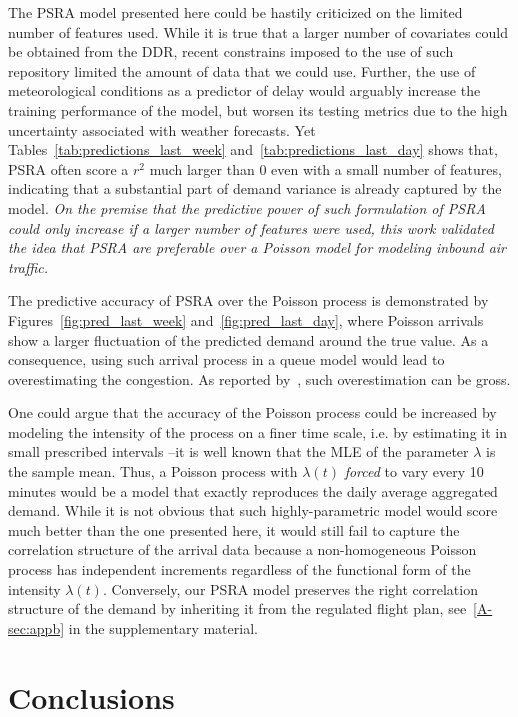 \documentclass[]{elsarticle}
\makeatletter
\newcommand*{\ie}{i.e.\@\xspace}
\makeatother
\begin{document}
  The \ac{PSRA} model presented here could be hastily criticized on the limited number of features used.
  While it is true that a larger number of covariates could be obtained from the \ac{DDR}, recent constrains imposed to the use of such repository limited the amount of data that we could use.
  Further, the use of meteorological conditions as a predictor of delay would arguably increase the training performance of the model, but worsen its testing metrics due to the high uncertainty associated with weather forecasts.
  Yet Tables~\ref{tab:predictions_last_week} and~\ref{tab:predictions_last_day} shows that, \ac{PSRA} often score a \(r^2\) much larger than 0 even with a small number of features, indicating that a substantial part of demand variance is already captured by the model.
  \emph{On the premise that the predictive power of such formulation of \ac{PSRA} could only increase if a larger number of features were used, this work validated the idea that \ac{PSRA} are preferable over a Poisson model for modeling inbound air traffic.}

  The predictive accuracy of \ac{PSRA} over the Poisson process is demonstrated by Figures~\ref{fig:pred_last_week} and~\ref{fig:pred_last_day}, where Poisson arrivals show a larger fluctuation of the predicted demand around the true value.
  As a consequence, using such arrival process in a queue model would lead to overestimating the congestion.
  As reported by~\citet{caccavale2014model}, such overestimation can be gross.

  One could argue that the accuracy of the Poisson process could be increased by modeling the intensity of the process on a finer time scale, \ie{} by estimating it in small prescribed intervals --it is well known that the \ac{MLE} of the parameter \(\lambda\) is the sample mean.
  Thus, a Poisson process with \(\lambda(t)\) \emph{forced} to vary every 10 minutes would be a model that exactly reproduces the daily average aggregated demand.
  While it is not obvious that such highly-parametric model would score much better than the one presented here, it would still fail to capture the correlation structure of the arrival data because a non-homogeneous Poisson process has independent increments regardless of the functional form of the intensity \(\lambda(t)\).
  Conversely, our \ac{PSRA} model preserves the right correlation structure of the demand by inheriting it from the regulated flight plan, see~\ref{A-sec:appb} in the supplementary material.

\section{Conclusions}\label{sec:conclusions}
\end{document}
